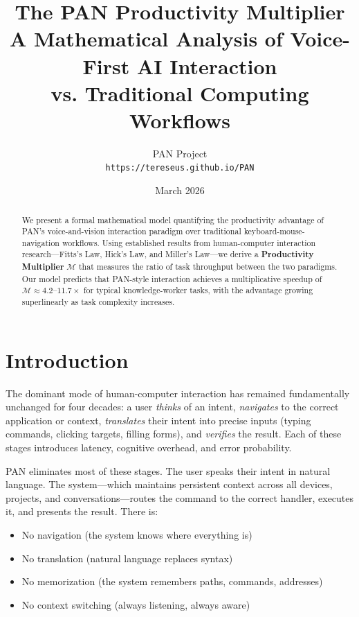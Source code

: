 \documentclass[11pt, a4paper]{article}
\title{
  \textbf{The PAN Productivity Multiplier} \\[0.5em]
  \large A Mathematical Analysis of Voice-First AI Interaction \\
  vs. Traditional Computing Workflows
}
\author{
  PAN Project \\
  \texttt{https://tereseus.github.io/PAN}
}
\date{March 2026}
\begin{document}
\maketitle

\begin{abstract}
We present a formal mathematical model quantifying the productivity advantage
of PAN's voice-and-vision interaction paradigm over traditional
keyboard-mouse-navigation workflows. Using established results from
human-computer interaction research---Fitts's Law, Hick's Law, and Miller's
Law---we derive a \textbf{Productivity Multiplier} $\mathcal{M}$ that
measures the ratio of task throughput between the two paradigms. Our model
predicts that PAN-style interaction achieves a multiplicative speedup of
$\mathcal{M} \approx 4.2\text{--}11.7\times$ for typical knowledge-worker
tasks, with the advantage growing superlinearly as task complexity increases.
\end{abstract}

\tableofcontents
\newpage

\section{Introduction}

The dominant mode of human-computer interaction has remained fundamentally
unchanged for four decades: a user \emph{thinks} of an intent, \emph{navigates}
to the correct application or context, \emph{translates} their intent into
precise inputs (typing commands, clicking targets, filling forms), and
\emph{verifies} the result. Each of these stages introduces latency, cognitive
overhead, and error probability.

PAN eliminates most of these stages. The user speaks their intent in natural
language. The system---which maintains persistent context across all devices,
projects, and conversations---routes the command to the correct handler, executes
it, and presents the result. There is:

\begin{itemize}[noitemsep]
  \item No navigation (the system knows where everything is)
  \item No translation (natural language replaces syntax)
  \item No memorization (the system remembers paths, commands, addresses)
  \item No context switching (always listening, always aware)
\end{itemize}
\end{document}
